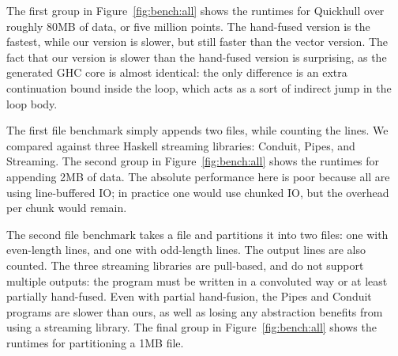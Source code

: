 The first group in Figure~\ref{fig:bench:all} shows the runtimes for Quickhull over roughly 80MB of data, or five million points.
The hand-fused version is the fastest, while our version is slower, but still faster than the vector version.
The fact that our version is slower than the hand-fused version is surprising, as the generated GHC core is almost identical: the only difference is an extra continuation bound inside the loop, which acts as a sort of indirect jump in the loop body.

The first file benchmark simply appends two files, while counting the lines.
We compared against three Haskell streaming libraries: Conduit, Pipes, and Streaming.
The second group in Figure~\ref{fig:bench:all} shows the runtimes for appending 2MB of data.
The absolute performance here is poor because all are using line-buffered IO; in practice one would use chunked IO, but the overhead per chunk would remain.

The second file benchmark takes a file and partitions it into two files: one with even-length lines, and one with odd-length lines.
The output lines are also counted.
The three streaming libraries are pull-based, and do not support multiple outputs: the program must be written in a convoluted way or at least partially hand-fused.
Even with partial hand-fusion, the Pipes and Conduit programs are slower than ours, as well as losing any abstraction benefits from using a streaming library.
The final group in Figure~\ref{fig:bench:all} shows the runtimes for partitioning a 1MB file.








